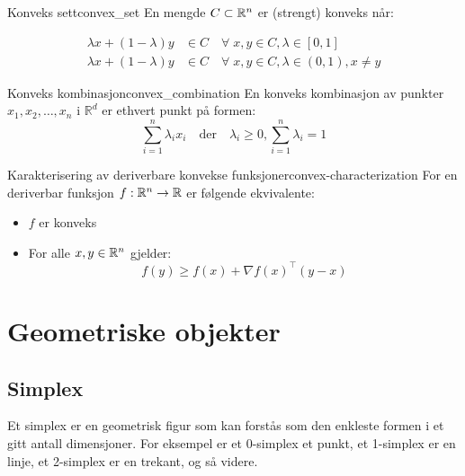 \begin{definition}{Konveks sett}{convex_set}
	En mengde \(C \subset \mathbb{R}^n\) er (strengt) konveks når:

	\begin{align*}
		\lambda x + (1 - \lambda)y & \in C \quad \forall \; x, y \in C, \lambda \in [0, 1] \tag{Konveks}                   \\
		\lambda x + (1 - \lambda)y & \in C \quad \forall \; x, y \in C, \lambda \in (0, 1), x \neq y \tag{Strengt konveks}
	\end{align*}

\end{definition}

\begin{definition}{Konveks kombinasjon}{convex_combination}
	En konveks kombinasjon av punkter $x_1, x_2, \ldots, x_n$ i $\mathbb{R}^d$ er ethvert punkt på formen:
	\[
		\sum_{i=1}^n \lambda_i x_i \quad \text{der} \quad \lambda_i \geq 0, \sum_{i=1}^n \lambda_i = 1
	\]
\end{definition}

\begin{remark}{Karakterisering av deriverbare konvekse funksjoner}{convex-characterization}
	For en deriverbar funksjon  \(f: \mathbb{R}^n \to \mathbb{R}\) er følgende ekvivalente:
	\begin{itemize}
		\item  \(f\) er konveks
		\item For alle  \(x, y \in \mathbb{R}^n\) gjelder:
		      \[
			      f(y) \geq f(x) + \nabla f(x)^\top (y - x)
		      \]
	\end{itemize}
\end{remark}

\section{Geometriske objekter}
\subsection{Simplex}
Et simplex er en geometrisk figur som kan forstås som den enkleste formen i et gitt antall dimensjoner. For eksempel er et 0-simplex et punkt, et 1-simplex er en linje, et 2-simplex er en trekant, og så videre.

